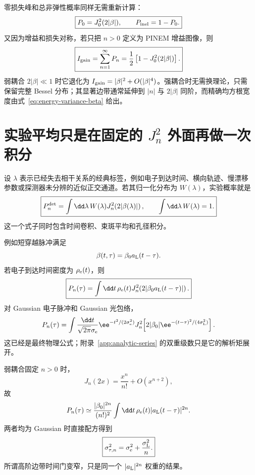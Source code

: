 零损失峰和总非弹性概率同样无需重新计算：
\begin{equation}
\boxed{
P_0=J_0^2(2|\beta|),
\qquad
P_{\rm inel}=1-P_0.}
\label{eq:inelastic-total}
\end{equation}
又因为增益和损失对称，若只把 \(n>0\) 定义为 PINEM 增益图像，则
\begin{equation}
\boxed{
I_{\rm gain}=\sum_{n=1}^{\infty}P_n
=\frac12\left[1-J_0^2(2|\beta|)\right].}
\label{eq:gain-image-general}
\end{equation}
弱耦合 \(2|\beta|\ll1\) 时它退化为 \(I_{\rm gain}=|\beta|^2+O(|\beta|^4)\)。强耦合时无需换理论，只需保留完整 Bessel 分布；其显著边带通常延伸到 \(|n|\) 与 \(2|\beta|\) 同阶，而精确均方根宽度由式~\eqref{eq:energy-variance-beta} 给出。

\section{实验平均只是在固定的 \texorpdfstring{$J_n^2$}{Jn2} 外面再做一次积分}

设 \(\lambda\) 表示已经失去相干关系的经典标签，例如电子到达时间、横向轨迹、慢漂移参数或探测器未分辨的近似正交通道。若其归一化分布为 \(W(\lambda)\)，实验概率就是
\begin{equation}
\boxed{
P_n^{\rm det}
=\int\dd\lambda\,W(\lambda)
J_n^2\!\left(2|\beta(\lambda)|\right),
\qquad
\int\dd\lambda\,W(\lambda)=1.}
\label{eq:general-classical-average}
\end{equation}
这一个式子同时包含时间卷积、束斑平均和孔径积分。

例如短穿越脉冲满足
\begin{equation}
\beta(t,\tau)=\beta_0a_{\rm L}(t-\tau).
\end{equation}
若电子到达时间密度为 \(\rho_{\rm e}(t)\)，则
\begin{equation}
\boxed{
P_n(\tau)
=\int\dd t\,\rho_{\rm e}(t)
J_n^2\!\left(2|\beta_0a_{\rm L}(t-\tau)|\right).}
\label{eq:general-pulse-convolution}
\end{equation}
对 Gaussian 电子脉冲和 Gaussian 光包络，
\begin{equation}
P_n(\tau)
=\int\frac{\dd t}{\sqrt{2\pi}\sigma_{\rm e}}
\ee^{-t^2/(2\sigma_{\rm e}^2)}
J_n^2\!\left[
2|\beta_0|\ee^{-(t-\tau)^2/(4\sigma_{\rm L}^2)}
\right].
\label{eq:Pn-gaussian}
\end{equation}
这已经是最终物理公式；附录~\ref{app:analytic-series} 的双重级数只是它的解析矩展开。

弱耦合固定 \(n>0\) 时，
\begin{equation}
J_n(2x)=\frac{x^n}{n!}+O(x^{n+2}),
\end{equation}
故
\begin{equation}
P_n(\tau)
\simeq\frac{|\beta_0|^{2n}}{(n!)^2}
\int\dd t\,\rho_{\rm e}(t)|a_{\rm L}(t-\tau)|^{2n}.
\end{equation}
两者均为 Gaussian 时直接配方得到
\begin{equation}
\boxed{
\sigma_{\tau,n}^2
=\sigma_{\rm e}^2+\frac{\sigma_{\rm L}^2}{n}.}
\label{eq:nth-order-temporal-width}
\end{equation}
所谓高阶边带时间门变窄，只是同一个 \(|a_{\rm L}|^{2n}\) 权重的结果。

